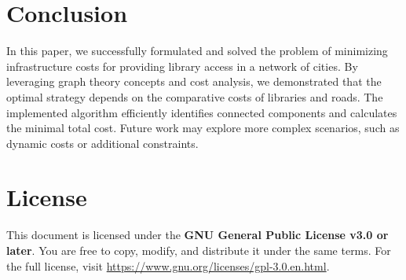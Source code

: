 \documentclass[11pt, a4paper, oneside]{article}
\begin{document}
\section*{Conclusion}

In this paper, we successfully formulated and solved the problem of minimizing infrastructure costs for providing library access in a network of cities. By leveraging graph theory concepts and cost analysis, we demonstrated that the optimal strategy depends on the comparative costs of libraries and roads. The implemented algorithm efficiently identifies connected components and calculates the minimal total cost. Future work may explore more complex scenarios, such as dynamic costs or additional constraints.

\section*{License}

This document is licensed under the \textbf{GNU General Public License v3.0 or later}. You are free to copy, modify, and distribute it under the same terms. For the full license, visit \url{https://www.gnu.org/licenses/gpl-3.0.en.html}.

\printbibliography
\end{document}

